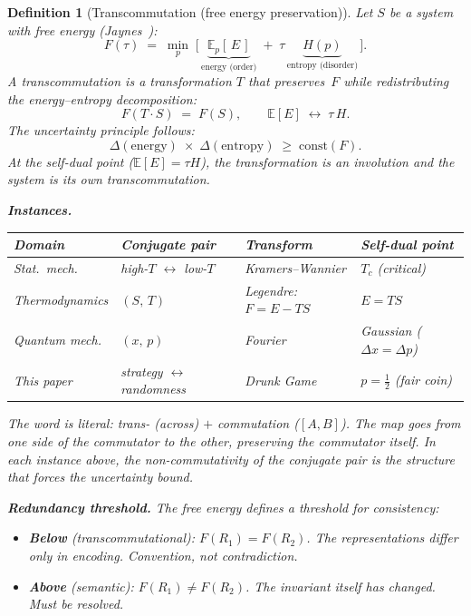 \documentclass[11pt,a4paper]{article}
\newtheorem{definition}[theorem]{Definition}
\begin{document}
\begin{definition}[Transcommutation (free energy preservation)]%
\label{def:transcommutation}
Let $S$ be a system with \emph{free energy}
(Jaynes~\cite{Jaynes57}):
\[
  F(\tau) \;=\; \min_p \;\bigl[\,
    \underbrace{\mathbb{E}_p[\,E\,]}_{\text{energy (order)}}
    \;+\;
    \tau\,
    \underbrace{H(p)}_{\text{entropy (disorder)}}
  \,\bigr].
\]
A \emph{transcommutation} is a transformation $T$ that
preserves~$F$ while redistributing the energy--entropy
decomposition:
\[
  F(T \cdot S) \;=\; F(S),
  \qquad
  \mathbb{E}[E] \;\leftrightarrow\; \tau\, H.
\]
The uncertainty principle follows:
\[
  \Delta(\text{energy}) \;\times\; \Delta(\text{entropy})
  \;\geq\; \mathrm{const}(F).
\]
At the \emph{self-dual point}
($\mathbb{E}[E] = \tau H$),
the transformation is an involution
and the system is its own transcommutation.

\medskip\noindent
\textbf{Instances.}\;
\begin{center}
\small
\begin{tabular}{@{}llll@{}}
\toprule
\textbf{Domain} & \textbf{Conjugate pair} &
\textbf{Transform} & \textbf{Self-dual point} \\
\midrule
Stat.\ mech.\ \cite{KW41} &
  high-$T$ $\leftrightarrow$ low-$T$ &
  Kramers--Wannier &
  $T_c$ (critical) \\
Thermodynamics &
  $(S,\, T)$ &
  Legendre: $F = E - TS$ &
  $E = TS$ \\
Quantum mech.\ &
  $(x,\, p)$ &
  Fourier &
  Gaussian ($\Delta x = \Delta p$) \\
This paper &
  strategy $\leftrightarrow$ randomness &
  Drunk Game &
  $p = \tfrac{1}{2}$ (fair coin) \\
\bottomrule
\end{tabular}
\end{center}

\noindent
The word is literal:
\emph{trans-} (across) $+$ \emph{commutation} ($[A, B]$).
The map goes from one side of the commutator
to the other, preserving the commutator itself.
In each instance above, the non-commutativity of the
conjugate pair is the structure that forces the
uncertainty bound.

\medskip\noindent
\textbf{Redundancy threshold.}\;
The free energy defines a threshold for consistency:
\begin{itemize}[nosep]
\item \textbf{Below} (transcommutational):
  $F(R_1) = F(R_2)$.
  The representations differ only in encoding.
  Convention, not contradiction.
\item \textbf{Above} (semantic):
  $F(R_1) \neq F(R_2)$.
  The invariant itself has changed.
  Must be resolved.
\end{itemize}
\end{definition}
\end{document}
